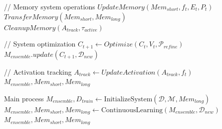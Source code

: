 \documentclass[conference]{IEEEtran}
\begin{document}
\begin{algorithm}[H]
\begin{algorithmic}[1]
            \State // Memory system operations
            \State $UpdateMemory(Mem_{short}, f_t, E_t, P_t)$  \\
            \State $TransferMemory(Mem_{short}, Mem_{long})$ \\
            \State $CleanupMemory(A_{track}, \tau_{active})$ \\
            
            \State // System optimization
            \State $C_{t+1} \gets Optimize(C_t, V_t, \mathcal{P}_{refine})$ \\
            \State $M_{ensemble}.update(C_{t+1}, \mathcal{D}_{new})$ \\
            
            \State // Activation tracking
            \State $A_{track} \gets UpdateActivation(A_{track}, f_t)$ \\
        \EndWhile
        \State \Return $M_{ensemble}, Mem_{short}, Mem_{long}$
    \EndFunction
    
    \State Main process
    \State $M_{ensemble}, D_{train} \gets \text{InitializeSystem}(\mathcal{D}, \mathcal{M}, Mem_{long})$
    \State $M_{ensemble}, Mem_{short}, Mem_{long} \gets \text{ContinuousLearning}(M_{ensemble}, \mathcal{D}_{new})$ 
    \State \Return $M_{ensemble}, Mem_{short}, Mem_{long}$
    \end{algorithmic}
\end{algorithm}
\end{document}
